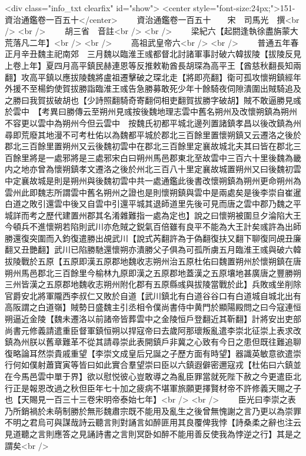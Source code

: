 <div class="info_txt clearfix" id="show">
<center style="font-size:24px;">151-資治通鑑卷一百五十</center>
  　　資治通鑑卷一百五十　　宋　司馬光　撰<br />
<br />
　　胡三省　音註<br />
<br />
　　梁紀六【起閼逢執徐盡旃蒙大荒落凡二年】<br />
<br />
　　高祖武皇帝六<br />
<br />
　　普通五年春正月辛丑魏主祀南郊　三月魏以臨淮王彧都督北討諸軍事討破六韓拔陵【拔陵反見上卷上年】夏四月高平鎮民赫連恩等反推敕勒酋長胡琛為高平王【酋慈秋翻長知兩翻】攻高平鎮以應拔陵魏將盧祖遷擊破之琛北走【將即亮翻】衛可孤攻懷朔鎮經年外援不至楊鈞使賀拔勝詣臨淮王彧告急勝募敢死少年十餘騎夜伺隙潰圍出賊騎追及之勝曰我賀拔破胡也【少詩照翻騎奇寄翻伺相吏翻賀拔勝字破胡】賊不敢逼勝見彧於雲中　【考異曰勝傳云至朔州見彧按後魏地理志雲中舊名朔州及改懷朔鎮為朔州不容更以雲中為朔州今但云雲中　按魏氏初都平城北邊列置諸鎮孝昌以後改鎮為州尋即荒廢其地漫不可考杜佑以為魏都平城於郡北三百餘里置懷朔鎮又云遷洛之後於郡北三百餘里置朔州又云後魏初雲中在郡北三百餘里定襄故城北夫其曰皆在郡北三百餘里將是一處邪將是三處邪宋白曰朔州馬邑郡東北至故雲中三百六十里後魏為畿内之地亦曾為懷朔鎮孝文遷洛之後於州北三百八十里定襄故城置朔州又曰後魏初雲中定襄故城是則是朔州與後魏初雲中共一處通鑑此後書改懷朔鎮為朔州更命朔州為雲州此即魏志所謂雲中舊名朔州之證也是則懷朔鎮與雲中是兩處矣是後李崇自崔暹白道之敗引還雲中後又自雲中引還平城其退師道里先後可見而唐之雲中郡乃魏之平城詳而考之歷代建置州郡其名淆雜難指一處為定也】說之曰懷朔被圍旦夕淪陷大王今頓兵不進懷朔若陷則武川亦危賊之鋭氣百倍雖有良平不能為大王計矣彧許為出師勝還復突圍而入鈞復遣勝出覘武川【說式芮翻許為于偽翻復扶又翻下聊復同覘丑廉翻又丑艷翻】武川已陷勝馳還懷朔亦潰勝父子俱為可孤所虜五月臨淮王彧與破六韓拔陵戰於五原【五原即漢五原郡地魏收志朔州治五原杜佑曰魏置朔州於懷朔鎮在唐朔州馬邑郡北三百餘里今榆林九原即漢之五原郡地蓋漢之五原壤地甚廣唐之豐勝朔三州皆漢之五原郡地魏收志朔州附化郡有五原縣彧與拔陵當戰於此】兵敗彧坐削除官爵安北將軍隴西李叔仁又敗於自道【武川鎮北有白道谷谷口有白道城自城北出有高阪謂之白道嶺】賊勢日盛魏主引丞相令僕尚書侍中黄門於顯陽殿問之曰今寇連恒朔逼近金陵【魏未遷洛以前諸帝皆葬雲中之金陵恒戶登翻近其靳翻】計將安出吏部尚書元修義請遣重臣督軍鎮恒朔以捍寇帝曰去歲阿那瓌叛亂遣李崇北征崇上表求改鎮為州朕以舊章難革不從其請尋崇此表開鎮戶非冀之心致有今日之患但既往難追聊復略論耳然崇貴戚重望【李崇文成皇后兄誕之子歷方面有時望】器識英敏意欲遣崇行何如僕射蕭寶寅等皆曰如此實合羣望崇曰臣以六鎮遐僻密邇寇戎【杜佑曰六鎮並在今馬邑雲中單于界】欲以慰悦彼心豈敢導之為亂臣罪當就死陛下赦之今更遣臣北行正是報恩改過之秋但臣年七十加之疲病不堪軍旅願更擇賢材帝不許修義天賜之子也【天賜見一百三十三卷宋明帝泰始七年】<br />
<br />
　　臣光曰李崇之表乃所銷禍於未萌制勝於無形魏肅宗既不能用及亂生之後曾無愧謝之言乃更以為崇罪不明之君烏可與謀哉詩云聽言則對誦言如醉匪用其良覆俾我悖【詩桑柔之辭也注云見道聽之言則應答之見誦詩書之言則冥卧如醉不能用善反使我為悖逆之行】其是之謂矣<br />
